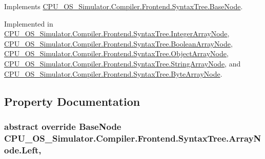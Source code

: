 Implements \hyperlink{class_c_p_u___o_s___simulator_1_1_compiler_1_1_frontend_1_1_syntax_tree_1_1_base_node_a092377df64002c5e9c023a259e5e11d0}{C\+P\+U\+\_\+\+O\+S\+\_\+\+Simulator.\+Compiler.\+Frontend.\+Syntax\+Tree.\+Base\+Node}.



Implemented in \hyperlink{class_c_p_u___o_s___simulator_1_1_compiler_1_1_frontend_1_1_syntax_tree_1_1_integer_array_node_a7abbf1320b21da1362fc8d391907d33f}{C\+P\+U\+\_\+\+O\+S\+\_\+\+Simulator.\+Compiler.\+Frontend.\+Syntax\+Tree.\+Integer\+Array\+Node}, \hyperlink{class_c_p_u___o_s___simulator_1_1_compiler_1_1_frontend_1_1_syntax_tree_1_1_boolean_array_node_a192727033dc9533113312210f04a958a}{C\+P\+U\+\_\+\+O\+S\+\_\+\+Simulator.\+Compiler.\+Frontend.\+Syntax\+Tree.\+Boolean\+Array\+Node}, \hyperlink{class_c_p_u___o_s___simulator_1_1_compiler_1_1_frontend_1_1_syntax_tree_1_1_object_array_node_a1d792b3929152ecfa25dac2e8c6444cc}{C\+P\+U\+\_\+\+O\+S\+\_\+\+Simulator.\+Compiler.\+Frontend.\+Syntax\+Tree.\+Object\+Array\+Node}, \hyperlink{class_c_p_u___o_s___simulator_1_1_compiler_1_1_frontend_1_1_syntax_tree_1_1_string_array_node_ae8ce8f85a313e577506546a26c954e34}{C\+P\+U\+\_\+\+O\+S\+\_\+\+Simulator.\+Compiler.\+Frontend.\+Syntax\+Tree.\+String\+Array\+Node}, and \hyperlink{class_c_p_u___o_s___simulator_1_1_compiler_1_1_frontend_1_1_syntax_tree_1_1_byte_array_node_a1ed9d8d35aeb8537758718aa1bae1ae0}{C\+P\+U\+\_\+\+O\+S\+\_\+\+Simulator.\+Compiler.\+Frontend.\+Syntax\+Tree.\+Byte\+Array\+Node}.



\subsection{Property Documentation}
\hypertarget{class_c_p_u___o_s___simulator_1_1_compiler_1_1_frontend_1_1_syntax_tree_1_1_array_node_a432b69f0632ea4f0132e500712760bfe}{}
\subsubsection[{Left}]{\setlength{\rightskip}{0pt plus 5cm}abstract override {\bf Base\+Node} C\+P\+U\+\_\+\+O\+S\+\_\+\+Simulator.\+Compiler.\+Frontend.\+Syntax\+Tree.\+Array\+Node.\+Left\hspace{0.3cm}{\ttfamily [get]}, {\ttfamily [set]}}\label{class_c_p_u___o_s___simulator_1_1_compiler_1_1_frontend_1_1_syntax_tree_1_1_array_node_a432b69f0632ea4f0132e500712760bfe}


